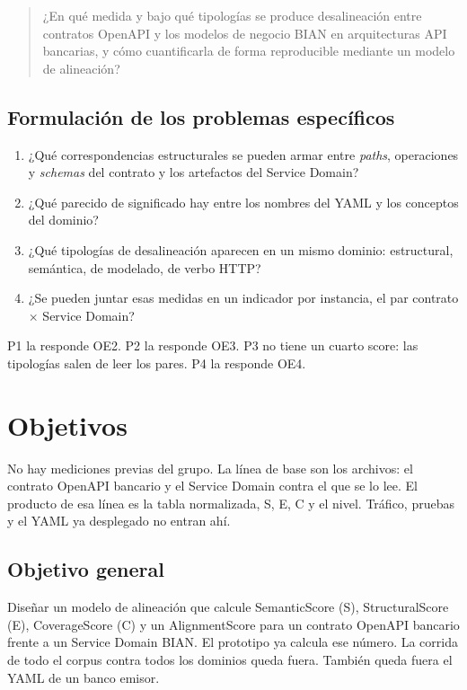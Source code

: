 \begin{quote}
¿En qué medida y bajo qué tipologías se produce desalineación entre contratos OpenAPI y los modelos de negocio BIAN en arquitecturas API bancarias, y cómo cuantificarla de forma reproducible mediante un modelo de alineación?
\end{quote}

\subsection{Formulación de los problemas específicos}

\begin{enumerate}[label=P\arabic*.]
  \item ¿Qué correspondencias estructurales se pueden armar entre \textit{paths}, operaciones y \textit{schemas} del contrato y los artefactos del Service Domain?
  \item ¿Qué parecido de significado hay entre los nombres del YAML y los conceptos del dominio?
  \item ¿Qué tipologías de desalineación aparecen en un mismo dominio: estructural, semántica, de modelado, de verbo HTTP?
  \item ¿Se pueden juntar esas medidas en un indicador por instancia, el par contrato $\times$ Service Domain?
\end{enumerate}

P1 la responde OE2. P2 la responde OE3. P3 no tiene un cuarto score: las tipologías salen de leer los pares. P4 la responde OE4.

\section{Objetivos}

No hay mediciones previas del grupo. La línea de base son los archivos: el contrato OpenAPI bancario y el Service Domain contra el que se lo lee. El producto de esa línea es la tabla normalizada, S, E, C y el nivel. Tráfico, pruebas y el YAML ya desplegado no entran ahí.

\subsection{Objetivo general}

Diseñar un modelo de alineación que calcule SemanticScore (S), StructuralScore (E), CoverageScore (C) y un AlignmentScore para un contrato OpenAPI bancario frente a un Service Domain BIAN. El prototipo ya calcula ese número. La corrida de todo el corpus contra todos los dominios queda fuera. También queda fuera el YAML de un banco emisor.

